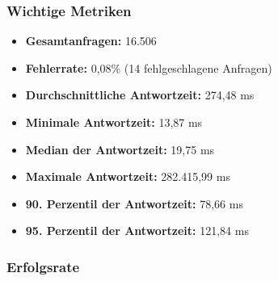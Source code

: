 \subsubsection*{Wichtige Metriken}
\begin{itemize}
    \item \textbf{Gesamtanfragen:} 16.506
    \item \textbf{Fehlerrate:} 0,08\% (14 fehlgeschlagene Anfragen)
    \item \textbf{Durchschnittliche Antwortzeit:} 274,48 ms
    \item \textbf{Minimale Antwortzeit:} 13,87 ms
    \item \textbf{Median der Antwortzeit:} 19,75 ms
    \item \textbf{Maximale Antwortzeit:} 282.415,99 ms
    \item \textbf{90. Perzentil der Antwortzeit:} 78,66 ms
    \item \textbf{95. Perzentil der Antwortzeit:} 121,84 ms
\end{itemize}

\subsubsection*{Erfolgsrate}

\begin{table}[!htbp]
    \centering
    \caption{Tests je Endpunkt und Erfolgsrate}
    \label{tab:test_success_rate}    
\end{table}

